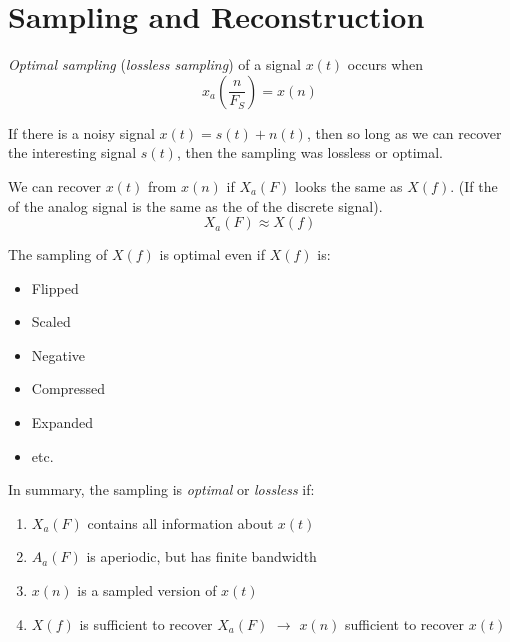 \section{Sampling and Reconstruction}\label{sec:Sampling_and_Reconstruction}
\begin{definition}\label{def:Optimal_Sampling}
  \emph{Optimal sampling} (\emph{lossless sampling}) of a signal $x(t)$ occurs when
  \begin{equation}\label{eq:Optimal_Sampling}
    x_{a}\left( \frac{n}{F_{S}} \right) = x(n)
  \end{equation}

  If there is a noisy signal $x(t) = s(t) + n(t)$, then so long as we can recover the interesting signal $s(t)$, then the sampling was lossless or optimal.

  We can recover $x(t)$ from $x(n)$ if $X_{a}(F)$ looks the same as $X(f)$.
  (If the  of the analog signal is the same as the  of the discrete signal).
  \begin{equation}\label{eq:Recover_Signal}
    X_{a}(F) \approx X(f)
  \end{equation}
  \begin{remark}[Shape of $X(f)$]
    The sampling of $X(f)$ is optimal even if $X(f)$ is:
    \begin{itemize}[noitemsep]
    \item Flipped
    \item Scaled
    \item Negative
    \item Compressed
    \item Expanded
    \item etc.
    \end{itemize}
  \end{remark}

  In summary, the sampling is \emph{optimal} or \emph{lossless} if:
  \begin{enumerate}[noitemsep]
  \item $X_{a}(F)$ contains all information about $x(t)$
  \item $A_{a}(F)$ is aperiodic, but has finite bandwidth
  \item $x(n)$ is a sampled version of $x(t)$
  \item $X(f)$ is sufficient to recover $X_{a}(F)$ $\longrightarrow$ $x(n)$ sufficient to recover $x(t)$
  \end{enumerate}
\end{definition}

